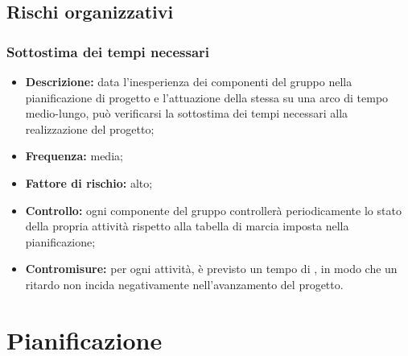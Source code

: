 \documentclass[./PianodiProgetto.tex]{subfiles}
\begin{document}
	\section{Rischi organizzativi}
	\subsection{Sottostima dei tempi necessari}
	\begin{itemize}
		\item \textbf{Descrizione:} data l'inesperienza dei componenti del gruppo nella pianificazione di progetto e l'attuazione della stessa su una arco di tempo medio-lungo, può verificarsi la sottostima dei tempi necessari alla realizzazione del progetto;
		\item \textbf{Frequenza:} media;
		\item \textbf{Fattore di rischio:} alto;
		\item \textbf{Controllo:} ogni componente del gruppo controllerà periodicamente lo stato della propria attività rispetto alla tabella di marcia imposta nella pianificazione;
		\item \textbf{Contromisure:} per ogni attività, è previsto un tempo di , in modo che un ritardo non incida negativamente nell'avanzamento del progetto.
	\end{itemize}
	
	\chapter{Pianificazione}
\end{document}
